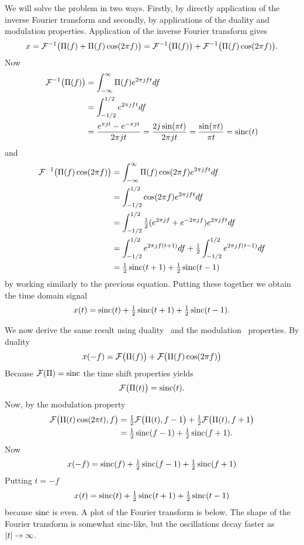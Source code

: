 \begin{excersizelist}
\begin{solution}
We will solve the problem in two ways.  Firstly, by directly application of the inverse Fourier transform and secondly, by applications of the duality and modulation properties.  Application of the inverse Fourier transform gives
\[
x = {\mathcal F}^{-1}\big(\Pi(f) + \Pi(f)\cos(2\pi f)\big) = {\mathcal F}^{-1}\big(\Pi(f)\big) + {\mathcal F}^{-1}\big(\Pi(f)\cos(2\pi f)\big).
\]
Now
\begin{align*}
{\mathcal F}^{-1}\big(\Pi(f)\big) &= \int_{-\infty}^\infty \Pi(f) e^{2\pi j f t} df \\
&=\int_{-1/2}^{1/2} e^{2\pi j  f t} df \\
&= \frac{e^{\pi j t} - e^{-\pi j t}}{2\pi j t} = \frac{2j \sin(\pi t)}{2 \pi j t} =  \frac{\sin(\pi t)}{\pi t} = \operatorname{sinc}(t) 
\end{align*}
and
\begin{align*}
{\mathcal F}^{-1}\big(\Pi(f)\cos(2\pi f)\big) &= \int_{-\infty}^\infty \Pi(f)\cos(2\pi f) e^{2\pi j f t} df \\
&= \int_{-1/2}^{1/2} \cos(2\pi f) e^{2\pi j  f t} df \\
&= \int_{-1/2}^{1/2} \tfrac{1}{2} (e^{2\pi j f} + e^{-2\pi j f}) e^{2\pi j f t} df \\
&= \int_{-1/2}^{1/2} e^{2 \pi j f (t + 1)} df + \tfrac{1}{2} \int_{-1/2}^{1/2} e^{2 \pi j f (t - 1)} df \\
&= \tfrac{1}{2}\operatorname{sinc}(t + 1) + \tfrac{1}{2}\operatorname{sinc}(t-1)
\end{align*}
by working similarly to the previous equation.  Putting these together we obtain the time domain signal
\[
x(t) = \operatorname{sinc}(t) + \tfrac{1}{2}\operatorname{sinc}(t + 1) + \tfrac{1}{2}\operatorname{sinc}(t-1).
\] 

We now derive the same result using duality~ and the modulation~ properties.  By duality
\[
x(-f) = {\mathcal F}\big(\Pi(f)\big) + {\mathcal F}\big(\Pi(f)\cos(2\pi f)\big)
\]
Because ${\mathcal F}(\Pi) = \operatorname{sinc}$  the time shift properties yields
\[
{\mathcal F}\big(\Pi(t)\big) = \operatorname{sinc}(t).
\]
Now, by the modulation property
\begin{align*}
{\mathcal F}\big(\Pi(t)\cos(2\pi t), f\big) &= \tfrac{1}{2}{\mathcal F}\big(\Pi(t), f - 1\big) + \tfrac{1}{2}{\mathcal F}\big(\Pi(t), f + 1\big) \\
&= \tfrac{1}{2}\operatorname{sinc}(f - 1) + \tfrac{1}{2}\operatorname{sinc}(f + 1).
\end{align*}
Now
\[
x(-f) = \operatorname{sinc}(f) + \tfrac{1}{2}\operatorname{sinc}(f - 1) + \tfrac{1}{2}\operatorname{sinc}(f + 1)
\]
Putting $t = -f$
\[
x(t) = \operatorname{sinc}(t) + \tfrac{1}{2}\operatorname{sinc}(t + 1) + \tfrac{1}{2}\operatorname{sinc}(t - 1)
\] 
because $\operatorname{sinc}$ is even.  A plot of the Fourier transform is below.  The shape of the Fourier transform is somewhat sinc-like, but the oscillations decay faster as $\left\vert t \right\vert \to \infty$.


\end{solution}
\end{excersizelist}

